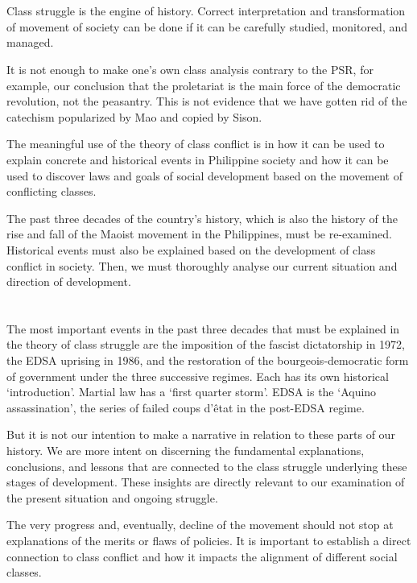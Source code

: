 \section{}
Class struggle is the engine of history. 
Correct interpretation and transformation of movement of society
can be done if it can be carefully studied, monitored, and managed.

It is not enough to make one's own class analysis contrary to the PSR,
for example, our conclusion that the proletariat is 
the main force of the democratic revolution, not the peasantry. 
This is not evidence that we have gotten rid 
of the catechism popularized by Mao and copied by Sison.

The meaningful use of the theory of class conflict 
is in how it can be used to explain 
concrete and historical events 
in Philippine society 
and how it can be used to discover laws and goals 
of social development based on the movement of conflicting classes.

The past three decades of the country's history,
which is also the history of the rise and fall of 
the Maoist movement in the Philippines,
must be re-examined. 
Historical events must also be explained based on the development 
of class conflict in society. 
Then,  we must thoroughly analyse our current situation 
and direction of development.

\section{}
The most important events in the past three decades that must be explained 
in the theory of class struggle are 
the imposition of the fascist dictatorship in 1972, 
the EDSA uprising in 1986, 
and the restoration of the bourgeois-democratic form of government 
under the three successive regimes. 
Each has its own historical `introduction'. 
Martial law has a `first quarter storm'. 
EDSA is the `Aquino assassination', 
the series of failed coups d'êtat in the post-EDSA regime.

But it is not our intention to make a narrative in relation 
to these parts of our history. 
We are more intent on 
discerning the fundamental explanations, conclusions, and lessons 
that are connected to the class struggle 
underlying these stages of development. 
These insights are directly relevant 
to our examination of the present situation and ongoing struggle.

The very progress and, eventually, decline of the movement 
should not stop at explanations of 
the merits or flaws of policies. 
It is important to establish 
a direct connection to class conflict 
and how it impacts the alignment of different social classes.

